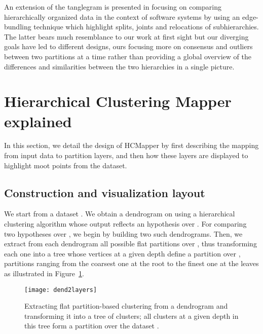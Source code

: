 \documentclass[10pt,conference,a4paper]{IEEEtran}
\begin{document}
An extension of the tanglegram is presented in \cite{VizHOD} focusing on comparing hierarchically organized data in the context of software systems by using an edge-bundling technique which highlight splits, joints and relocations of subhierarchies. The latter bears much resemblance to our work at first sight but our diverging goals have led to different designs, ours focusing more on consensus and outliers between two partitions at a time rather than providing a global overview of the differences and similarities between the two hierarchies in a single picture.





\section{Hierarchical Clustering Mapper explained}

In this section, we detail the design of HCMapper by first describing the mapping from input data to partition layers, and then how these layers are displayed to highlight moot points from the dataset.










\subsection{Construction and visualization layout}

We start from a dataset . We obtain a dendrogram on  using a hierarchical clustering algorithm whose output reflects an hypothesis over . For comparing two hypotheses over , we begin by building two such dendrograms. Then, we extract from each dendrogram all possible flat partitions over , thus transforming each one into a tree whose vertices at a given depth define a partition over , partitions ranging from the coarsest one at the root to the finest one at the leaves as illustrated in Figure~\ref{dend2layers}.

\begin{figure}[htb]
  \centering
\texttt{[image: dend2layers]}
  \caption{Extracting flat partition-based clustering from a dendrogram and transforming it into a tree of clusters; all clusters at a given depth in this tree form a partition over the dataset .}
  \label{dend2layers}
\end{figure}
  
\end{document}
